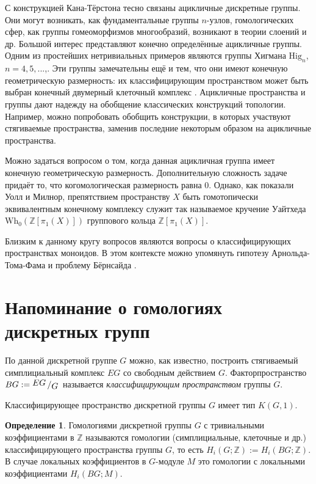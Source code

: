 \documentclass[14pt, dvipsnames]{extarticle}
\theoremstyle{definition}
\newtheorem{defi}{Определение}
\theoremstyle{remark}
\newcommand{\factor}[2]{{\raisebox{.2em}{$#1$}\left/\raisebox{-.2em}{$#2$}\right.}}
\begin{document}
С конструкцией Кана-Тёрстона тесно связаны ацикличные дискретные группы. Они могут возникать, как фундаментальные группы $n$-узлов, гомологических сфер, как группы гомеоморфизмов многообразий, возникают в теории слоений \cite{Berrick} и др. Большой интерес представляют конечно определённые ацикличные группы. Одним из простейших нетривиальных примеров \cite{Higman} являются группы Хигмана $\mathrm{Hig}_n$, $n=4, 5, ...$,. Эти группы замечательны ещё и тем, что они имеют конечную геометрическую размерность: их классифицирующим пространством может быть выбран конечный двумерный клеточный комплекс \cite{BDH}. Ацикличные пространства и группы дают надежду на обобщение классических конструкций топологии. Например, можно попробовать обобщить конструкции, в которых участвуют стягиваемые пространства, заменив последние некоторым образом на ацикличные пространства.

Можно задаться вопросом о том, когда данная ацикличная группа имеет конечную геометрическую размерность. Дополнительную сложность задаче придаёт то, что когомологическая размерность равна 0. Однако, как показали Уолл и Милнор, препятствием пространству $X$ быть гомотопически эквивалентным конечному комплексу служит так называемое кручение Уайтхеда $\mathrm{Wh}_0(\mathbb{Z}[\pi_1(X)])$ группового кольца $\mathbb{Z}[\pi_1(X)]$. 

Близким к данному кругу вопросов являются вопросы о классифицирующих пространствах моноидов. В этом контексте можно упомянуть гипотезу Арнольда-Тома-Фама \cite{Dobr} и проблему Бёрнсайда \cite{Burnside}. 



\section{Напоминание о гомологиях дискретных групп}

По данной дискретной группе $G$ можно, как известно, построить стягиваемый симплициальный комплекс $EG$ со свободным действием $G$. Факторпространство $BG:=\factor{EG}{G}$ называется {\it классифицирующим пространством} группы $G$. 

Классифицирующее пространство дискретной группы $G$ имеет тип $K(G, 1)$.

\begin{defi}
Гомологиями дискретной группы $G$ с тривиальными коэффициентами в $\mathbb{Z}$ называются гомологии (симплициальные, клеточные и др.) классифицирующего пространства группы $G$, то есть $H_i(G; \mathbb{Z}):=H_i(BG; \mathbb{Z})$. В случае локальных коэффициентов в $G$-модуле $M$ это гомологии с локальными коэффициентами $H_i(BG; M)$.
\end{defi}
\end{document}

